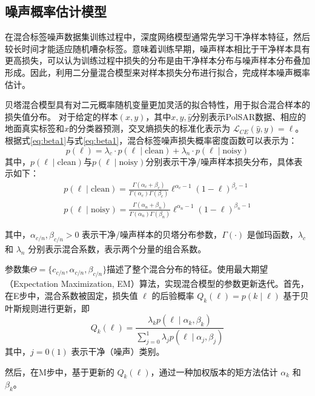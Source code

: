\subsection{噪声概率估计模型}
在混合标签噪声数据集训练过程中，深度网络模型通常先学习干净样本特征，然后较长时间才能适应随机嘈杂标签。意味着训练早期，噪声样本相比于干净样本具有更高损失，可以认为训练过程中损失的分布是由干净样本分布与噪声样本分布叠加形成。因此，利用二分量混合模型来对样本损失分布进行拟合，完成样本噪声概率估计。

贝塔混合模型具有对二元概率随机变量更加灵活的拟合特性\citing{}，用于拟合混合样本的损失值分布。
对于给定的样本$(x, y)$，其中$x, y, \hat{y}$分别表示PolSAR数据、相应的地面真实标签和$x$的分类器预测，交叉熵损失的标准化表示为 $\mathcal{L}_{CE}(\hat{y}, y) = \ell$。根据式\ref{eq:beta1}与式\ref{eq:beta1}，混合标签噪声损失概率密度函数可以表示为：
\begin{equation}
    p(\ell)=\lambda_c \cdot p(\ell \mid \text{clean})+\lambda_n \cdot p(\ell \mid \text{noisy})
\end{equation}
其中，$p(\ell \mid \text{clean})$与$p(\ell \mid \text{noisy})$分别表示干净/噪声样本损失分布，具体表示如下：
\begin{gather}
    p(\ell \mid \text{clean})=\frac{\Gamma(\alpha_c+\beta_c)}{\Gamma(\alpha_c) \Gamma(\beta_c)} \ell^{\alpha_c-1}(1-\ell)^{\beta_c-1} \\
    p(\ell \mid \text{noisy})=\frac{\Gamma(\alpha_n+\beta_n)}{\Gamma(\alpha_n) \Gamma(\beta_n)} \ell^{\alpha_n-1}(1-\ell)^{\beta_n-1}
\end{gather}

其中，$\alpha_{c/n}, \beta_{c/n} > 0$ 表示干净/噪声样本的贝塔分布参数，$\Gamma(\cdot)$ 是伽玛函数，$\lambda_{c}$ 和 $\lambda_{n}$ 分别表示混合系数，表示两个分量的组合系数。

参数集$\Theta = \{c_{c/n}, \alpha_{c/n}, \beta_{c/n}\}$描述了整个混合分布的特征。使用最大期望（Expectation Maximization, EM）算法，实现混合模型的参数更新迭代。首先，在E步中，混合系数被固定，损失值 \(\ell\) 的后验概率 \(Q_k(\ell)=p(k \mid \ell)\) 基于贝叶斯规则进行更新，即
\begin{equation}
    Q_k(\ell)=\frac{\lambda_k p(\ell \mid \alpha_k, \beta_k)}{\sum_{j=0}^{1}\lambda_j p(\ell \mid \alpha_j, \beta_j)}
\end{equation}
其中，$j=0(1)$ 表示干净（噪声）类别。

然后，在M步中，基于更新的 \(Q_k(\ell)\)，通过一种加权版本的矩方法估计 \(\alpha_k\) 和 \(\beta_k\)。


